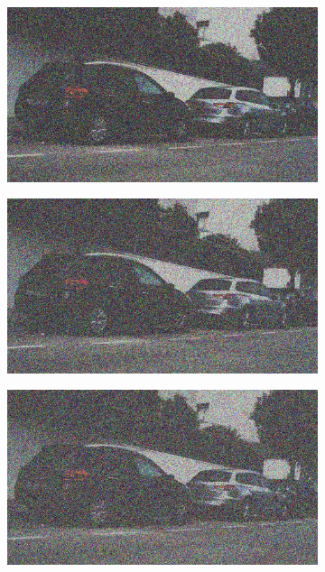 \documentclass[a4paper]{ctexart}
\begin{document}
\begin{figure}[htbp]
\begin{subfigure}{0.08\textwidth}
				\label{fig：Gamma=0.2, Gauss Noise = 0.7}
			\end{subfigure}
			\begin{subfigure}{0.08\textwidth}
				\captionsetup{font=scriptsize}
				\includegraphics[width=\linewidth]{picture/Edge Detection/degrade/RGB_001 Gamma=0.2, Gauss Noise=0.8}
				\label{fig：Gamma=0.2, Gauss Noise = 0.8}
			\end{subfigure}
			\begin{subfigure}{0.08\textwidth}
				\captionsetup{font=scriptsize}
				\includegraphics[width=\linewidth]{picture/Edge Detection/degrade/RGB_001 Gamma=0.2, Gauss Noise=0.9}
				\label{fig：Gamma=0.2, Gauss Noise = 0.9}
			\end{subfigure}
			\begin{subfigure}{0.08\textwidth}
				\captionsetup{font=scriptsize}
				\includegraphics[width=\linewidth]{picture/Edge Detection/degrade/RGB_001 Gamma=0.2, Gauss Noise=1.0}

\end{subfigure}
\end{figure}
\end{document}

